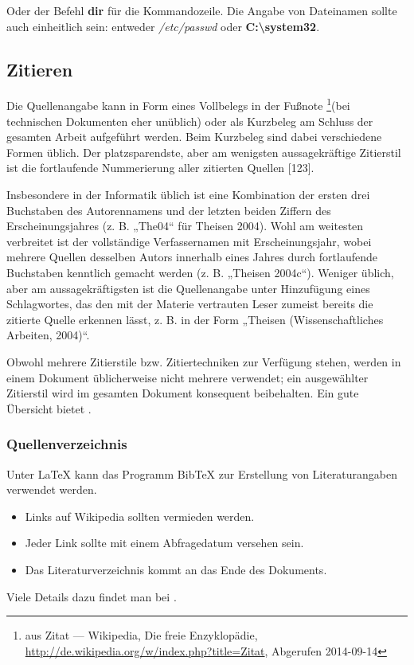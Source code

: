 \documentclass[a4paper,ngerman,naustrian,DIV=12,BCOR=1cm]{scrbook}
\newcommand{\strong}[1]{\textbf{#1}}
\begin{document}
Oder der Befehl \strong{dir} für die Kommandozeile. Die Angabe von
Dateinamen sollte auch einheitlich sein: entweder \emph{/etc/passwd}
oder \strong{C:\textbackslash{}system32}.


\subsection{Zitieren}

Die Quellenangabe kann in Form eines Vollbelegs in der Fußnote%
\footnote{aus Zitat --- Wikipedia, Die freie Enzyklopädie, \url{http://de.wikipedia.org/w/index.php?title=Zitat},
Abgerufen 2014-09-14%
}(bei technischen Dokumenten eher unüblich) oder als Kurzbeleg am Schluss
der gesamten Arbeit aufgeführt werden. Beim Kurzbeleg sind dabei verschiedene
Formen üblich. Der platzsparendste, aber am wenigsten aussagekräftige
Zitierstil ist die fortlaufende Nummerierung aller zitierten Quellen
{[}123{]}.

Insbesondere in der Informatik üblich ist eine Kombination der ersten
drei Buchstaben des Autorennamens und der letzten beiden Ziffern des
Erscheinungsjahres (z. B. „The04“ für Theisen 2004). Wohl am weitesten
verbreitet ist der vollständige Verfassernamen mit Erscheinungsjahr,
wobei mehrere Quellen desselben Autors innerhalb eines Jahres durch
fortlaufende Buchstaben kenntlich gemacht werden (z. B. „Theisen 2004c“).
Weniger üblich, aber am aussagekräftigsten ist die Quellenangabe unter
Hinzufügung eines Schlagwortes, das den mit der Materie vertrauten
Leser zumeist bereits die zitierte Quelle erkennen lässt, z. B. in
der Form „Theisen (Wissenschaftliches Arbeiten, 2004)“.

Obwohl mehrere Zitierstile bzw. Zitiertechniken zur Verfügung stehen,
werden in einem Dokument üblicherweise nicht mehrere verwendet; ein
ausgewählter Zitierstil wird im gesamten Dokument konsequent beibehalten.
Ein gute Übersicht bietet \cite{wiki:zitat}.


\subsubsection{Quellenverzeichnis}

Unter \LaTeX{} kann das Programm Bib\TeX{} zur Erstellung von Literaturangaben
verwendet werden.
\begin{itemize}
\item Links auf Wikipedia sollten vermieden werden.
\item Jeder Link sollte mit einem Abfragedatum versehen sein.
\item Das Literaturverzeichnis kommt an das Ende des Dokuments.
\end{itemize}
Viele Details dazu findet man bei \cite{wiki:zitat}.
\end{document}
